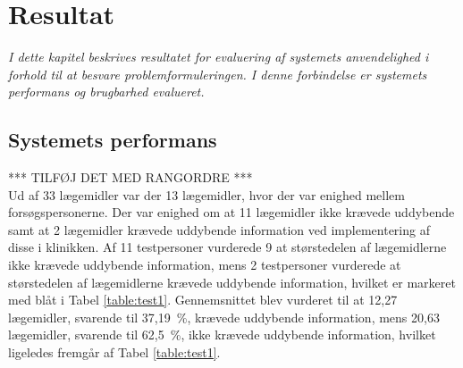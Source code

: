 \chapter{Resultat}
\textit{I dette kapitel beskrives resultatet for evaluering af systemets anvendelighed i forhold til at besvare problemformuleringen. I denne forbindelse er systemets performans og brugbarhed evalueret.}

\section{Systemets performans}
*** TILFØJ DET MED RANGORDRE *** \\
Ud af 33 lægemidler var der 13 lægemidler, hvor der var enighed  mellem forsøgspersonerne. Der var enighed om at 11 lægemidler ikke krævede uddybende samt at 2 lægemidler krævede uddybende information ved implementering af disse i klinikken. Af 11 testpersoner vurderede 9 at størstedelen af lægemidlerne ikke krævede uddybende information, mens 2 testpersoner vurderede at størstedelen af lægemidlerne krævede uddybende information, hvilket er markeret med blåt i Tabel \ref{table:test1}. Gennemsnittet blev vurderet til at 12,27 lægemidler, svarende til 37,19~\%, krævede uddybende information, mens 20,63 lægemidler, svarende til 62,5~\%, ikke krævede uddybende information, hvilket ligeledes fremgår af Tabel \ref{table:test1}. 

